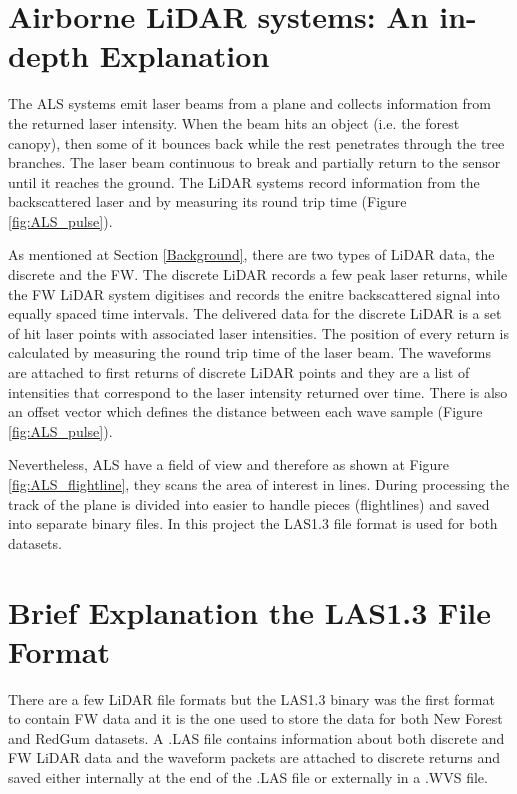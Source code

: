 \documentclass{subfiles}
\begin{document}
    \section{Airborne LiDAR systems: An in-depth Explanation}\label{sec:ALS}
     
        
    
    The ALS systems emit laser beams from a plane and collects information from the  returned laser intensity. When the beam hits an object (i.e. the forest canopy), then some of it bounces back while the rest penetrates through the tree branches. The laser beam continuous to break and partially return to the sensor until it reaches the ground. The LiDAR systems record information from the backscattered laser and by measuring its round trip time (Figure \ref{fig:ALS_pulse}). 

     
     As mentioned at Section \ref{Background}, there are two types of LiDAR data, the discrete and the FW. The discrete LiDAR records a few peak laser returns, while the FW LiDAR system digitises and records the enitre backscattered signal into equally spaced time intervals. The delivered data for the discrete LiDAR is a set of hit laser points with associated laser intensities. The position of every return is calculated by measuring the round trip time of the laser beam. The waveforms are attached to first returns of discrete LiDAR points and they are a list of intensities that correspond to the laser intensity returned over time. There is also an offset vector which defines the distance between each wave sample (Figure \ref{fig:ALS_pulse}).
     
    Nevertheless, ALS have a field of view and therefore as shown at Figure \ref{fig:ALS_flightline}, they scans the area of interest in lines. During processing the track of the plane is divided into easier to handle pieces (flightlines) and saved into separate binary files. In this project the LAS1.3 file format is used for both datasets. 
      
     
    \section{ Brief Explanation the LAS1.3 File Format} \label{sec:LAS1_3_specifications}
    
    \par There are a few LiDAR file formats but the LAS1.3 binary was the first format to contain FW data and it is the one used to store the data for both  New Forest and RedGum datasets. A .LAS file contains information about both discrete and FW LiDAR data and the waveform packets are attached to discrete returns and saved either internally at the end of the .LAS file or externally in a .WVS file. 
    
\end{document}

